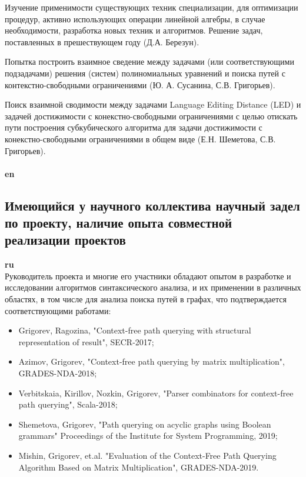 \documentclass[12pt]{article}  %
\theoremstyle{remark}
\begin{document}
Изучение применимости существующих техник специализации, для оптимизации процедур, активно использующих операции линейной алгебры, в случае необходимости, разработка новых техник и алгоритмов. Решение задач, поставленных в прешествующем году (Д.А. Березун).

Попытка построить взаимное сведение между задачами (или соответствующими подзадачами) решения (систем) полиномиальных уравнений и поиска путей с контекстно-свободными ограничениями (Ю. А. Сусанина, С.В. Григорьев).

Поиск взаимной сводимости между задачами Language Editing Distance (LED) и задачей достижимости с конекстно-свободными ограничениями с целью отискать пути построения субкубического алгоритма для задачи достижимости с конекстно-свободными ограничениями в общем виде (Е.Н. Шеметова, С.В. Григорьев).
\\
\\
\textbf{en}\\

\subsection{Имеющийся у научного коллектива научный задел по проекту, наличие опыта совместной реализации проектов}

\textbf{ru}\\
%
Руководитель проекта и многие его участники обладают опытом в разработке и исследовании алгоритмов синтаксического анализа, и их применении в различных областях, в том числе для анализа поиска путей в графах, что подтверждается соответствующими работами:
\begin{itemize}
  \item Grigorev, Ragozina, "Context-free path querying with structural representation of result", SECR-2017;
  \item Azimov, Grigorev, "Context-free path querying by matrix multiplication", GRADES-NDA-2018;
  \item Verbitskaia, Kirillov, Nozkin, Grigorev, "Parser combinators for context-free path querying", Scala-2018;
  \item Shemetova, Grigorev, "Path querying on acyclic graphs using Boolean grammars" Proceedings of the Institute for System Programming, 2019;
  \item Mishin, Grigorev, et.al. "Evaluation of the Context-Free Path Querying Algorithm Based on Matrix Multiplication", GRADES-NDA-2019.
\end{itemize}
\end{document}
